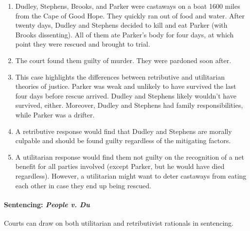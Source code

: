 \begin{enumerate}
    \item Dudley, Stephens, Brooks, and Parker were castaways on a boat 1600 
    miles from the Cape of Good Hope. They quickly ran out of food and water. 
    After twenty days, Dudley and Stephens decided to kill and eat Parker 
    (with Brooks dissenting). All of them ate Parker's body for four days, at 
    which point they were rescued and brought to trial.
    \item The court found them guilty of murder. They were pardoned soon 
    after.
    \item This case highlights the differences between retributive and 
    utilitarian theories of justice. Parker was weak and unlikely to have 
    survived the last four days before rescue arrived. Dudley and Stephens 
    likely wouldn't have survived, either. Moreover, Dudley and Stephens had 
    family responsibilities, while Parker was a drifter.
    \item A retributive response would find that Dudley and Stephens are 
    morally culpable and should be found guilty regardless of the mitigating 
    factors.
    \item A utilitarian response would find them not guilty on the recognition 
    of a net benefit for all parties involved (except Parker, but he would 
    have died regardless). However, a utilitarian might want to deter 
    castaways from eating each other in case they end up being rescued.
\end{enumerate}

\paragraph{Sentencing: \emph{People v. Du}}

Courts can draw on both utilitarian and retributivist rationals in sentencing.

